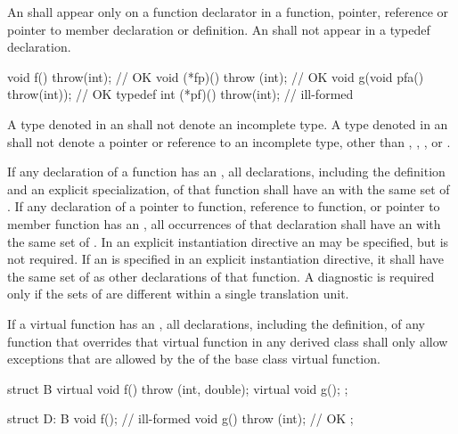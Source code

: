 An
shall appear only on a function declarator in a function,
pointer, reference or pointer to member declaration or definition.
An
shall not appear in a typedef declaration.
\enterexample
\begin{codeblock}
void f() throw(int);                    // OK
void (*fp)() throw (int);               // OK
void g(void pfa() throw(int));          // OK
typedef int (*pf)() throw(int);         // ill-formed
\end{codeblock}

\exitexampleb
{}%
A type denoted in an
shall not denote an incomplete type.
A type denoted in an
shall not denote a pointer or reference to an incomplete type, other than
,
,
,
or
.

\pnum
If any declaration of a function has an
,
all declarations, including the definition and an explicit specialization,
of that function shall have an
with the same set of .
If any declaration of a pointer to function, reference to function,
or pointer to member function has an
,
all occurrences of that declaration shall have an
with the same set of .
In an explicit instantiation directive an
may be specified, but is not required.
If an
is specified in an explicit instantiation directive, it shall
have the same set of  as
other declarations of that function.
A diagnostic is required only if the sets of 
are different within a single translation unit.

\pnum
{}%
If a virtual function has an
,
all declarations, including the definition, of any function
that overrides that virtual function in any derived class
shall only allow exceptions that are allowed by the
of the base class virtual function.
\enterexample
\begin{codeblock}
struct B {
    virtual void f() throw (int, double);
    virtual void g();
};

struct D: B {
    void f();			// ill-formed
    void g() throw (int);	// OK
};
\end{codeblock}

